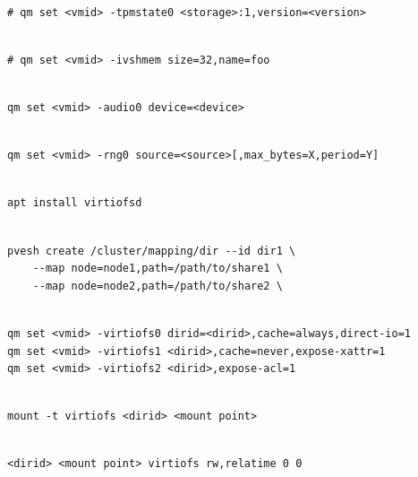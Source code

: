 \begin{lstlisting}

# qm set <vmid> -tpmstate0 <storage>:1,version=<version>

\end{lstlisting}

\begin{lstlisting}

# qm set <vmid> -ivshmem size=32,name=foo

\end{lstlisting}

\begin{lstlisting}

qm set <vmid> -audio0 device=<device>

\end{lstlisting}

\begin{lstlisting}

qm set <vmid> -rng0 source=<source>[,max_bytes=X,period=Y]

\end{lstlisting}

\begin{lstlisting}

apt install virtiofsd

\end{lstlisting}

\begin{lstlisting}

pvesh create /cluster/mapping/dir --id dir1 \
    --map node=node1,path=/path/to/share1 \
    --map node=node2,path=/path/to/share2 \

\end{lstlisting}

\begin{lstlisting}

qm set <vmid> -virtiofs0 dirid=<dirid>,cache=always,direct-io=1
qm set <vmid> -virtiofs1 <dirid>,cache=never,expose-xattr=1
qm set <vmid> -virtiofs2 <dirid>,expose-acl=1

\end{lstlisting}

\begin{lstlisting}

mount -t virtiofs <dirid> <mount point>

\end{lstlisting}

\begin{lstlisting}

<dirid> <mount point> virtiofs rw,relatime 0 0

\end{lstlisting}


